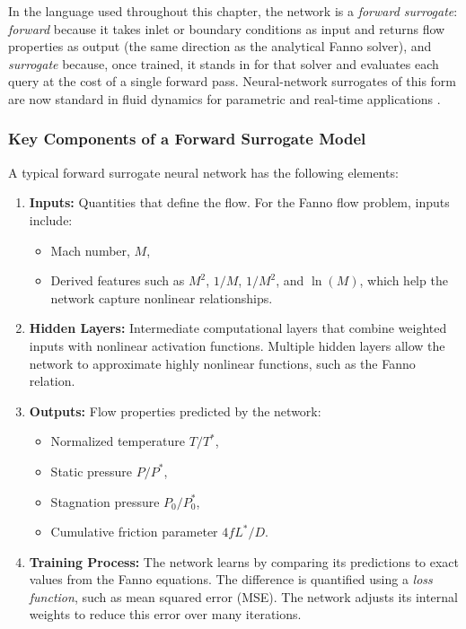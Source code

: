 \documentclass[11pt,a4paper]{report}
\begin{document}
In the language used throughout this chapter, the network is a \emph{forward surrogate}: \emph{forward} because it takes inlet or boundary conditions as input and returns flow properties as output (the same direction as the analytical Fanno solver), and \emph{surrogate} because, once trained, it stands in for that solver and evaluates each query at the cost of a single forward pass. Neural-network surrogates of this form are now standard in fluid dynamics for parametric and real-time applications \cite{Duraisamy2019, Brunton2020}.

\subsubsection{Key Components of a Forward Surrogate Model}

A typical forward surrogate neural network has the following elements:

\begin{enumerate}
    \item \textbf{Inputs:} Quantities that define the flow. For the Fanno flow problem, inputs include:
    \begin{itemize}
        \item Mach number, $M$,
        \item Derived features such as $M^2$, $1/M$, $1/M^2$, and $\ln(M)$, which help the network capture nonlinear relationships.
    \end{itemize}
    
    \item \textbf{Hidden Layers:} Intermediate computational layers that combine weighted inputs with nonlinear activation functions. Multiple hidden layers allow the network to approximate highly nonlinear functions, such as the Fanno relation.
    
    \item \textbf{Outputs:} Flow properties predicted by the network:
    \begin{itemize}
        \item Normalized temperature $T/T^*$,
        \item Static pressure $P/P^*$,
        \item Stagnation pressure $P_0/P_0^*$,
        \item Cumulative friction parameter $4 f L^*/D$.
    \end{itemize}
    
    \item \textbf{Training Process:} The network learns by comparing its predictions to exact values from the Fanno equations. The difference is quantified using a \emph{loss function}, such as mean squared error (MSE). The network adjusts its internal weights to reduce this error over many iterations.
\end{enumerate}
\end{document}
